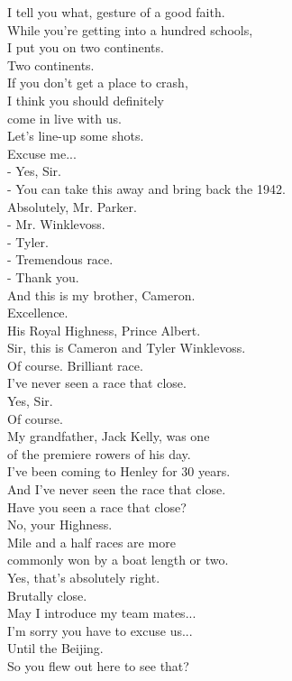 \documentclass{article}
\begin{document}
\begin{multicols}{3}
I tell you what, gesture of a good faith.\\
While you're getting into a hundred schools,\\
I put you on two continents.\\
Two continents.\\
If you don't get a place to crash,\\
I think you should definitely\\
come in live with us.\\
Let's line-up some shots.\\
Excuse me...\\
- Yes, Sir.\\
- You can take this away and bring back the 1942.\\
Absolutely, Mr. Parker.\\
- Mr. Winklevoss.\\
- Tyler.\\
- Tremendous race.\\
- Thank you.\\
And this is my brother, Cameron.\\
Excellence.\\
His Royal Highness, Prince Albert.\\
Sir, this is Cameron and Tyler Winklevoss.\\
Of course. Brilliant race.\\
I've never seen a race that close.\\
Yes, Sir.\\
Of course.\\
My grandfather, Jack Kelly, was one\\
of the premiere rowers of his day.\\
I've been coming to Henley for 30 years.\\
And I've never seen the race that close.\\
Have you seen a race that close?\\
No, your Highness.\\
Mile and a half races are more\\
commonly won by a boat length or two.\\
Yes, that's absolutely right.\\
Brutally close.\\
May I introduce my team mates...\\
I'm sorry you have to excuse us...\\
Until the Beijing.\\
So you flew out here to see that?\\

\end{multicols}
\end{document}
